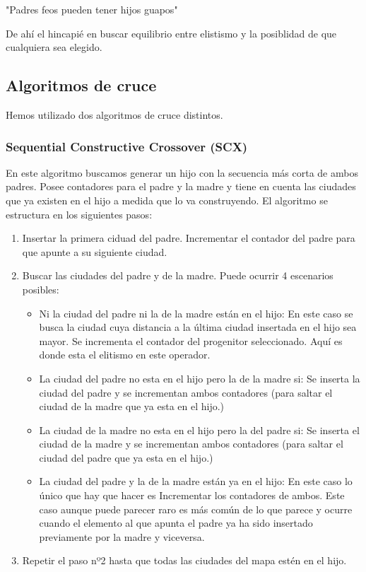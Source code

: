 \documentclass{article}
\begin{document}
    \hspace{5mm}"Padres feos pueden tener hijos guapos"
    
    De ahí el hincapié en buscar equilibrio entre elistismo y la posiblidad de que cualquiera sea elegido. 

\subsection{Algoritmos de cruce}
Hemos utilizado dos algoritmos de cruce distintos.
\subsubsection{Sequential Constructive Crossover (SCX)}
En este algoritmo buscamos generar un hijo con la secuencia más corta de ambos padres. Posee contadores para el padre y la madre 
y tiene en cuenta las ciudades que ya existen en el hijo a medida que lo va construyendo. El algoritmo se estructura en los 
siguientes pasos:
\begin{enumerate}
    \item Insertar la primera ciduad del padre. Incrementar el contador del padre para que apunte a su siguiente ciudad. 
    \item Buscar las ciudades del padre y de la madre. Puede ocurrir 4 escenarios posibles:
        \begin{itemize}
            \item Ni la ciudad del padre ni la de la madre están en el hijo: En este caso se busca la ciudad cuya distancia 
            a la última ciudad insertada en el hijo sea mayor. Se incrementa el contador del progenitor seleccionado. Aquí es donde 
            esta el elitismo en este operador. 
            \item La ciudad del padre no esta en el hijo pero la de la madre si: Se inserta la ciudad  del padre y se incrementan 
            ambos contadores (para saltar el ciudad de la madre que ya esta en el hijo.)
            \item La ciudad de la madre no esta en el hijo pero la del padre si: Se inserta el ciudad de la madre y se incrementan 
            ambos contadores (para saltar el ciudad del padre que ya esta en el hijo.)
            \item La ciudad del padre y la de la madre están ya en el hijo: En este caso lo único que hay que hacer es Incrementar
            los contadores de ambos.  Este caso aunque puede parecer raro es más común de lo que parece y ocurre cuando el elemento 
            al que apunta el padre ya ha sido insertado previamente por la madre y viceversa.%
        \end{itemize}
    
    \item Repetir el paso nº2 hasta que todas las ciudades del mapa estén en el hijo. 
\end{enumerate}
\end{document}
